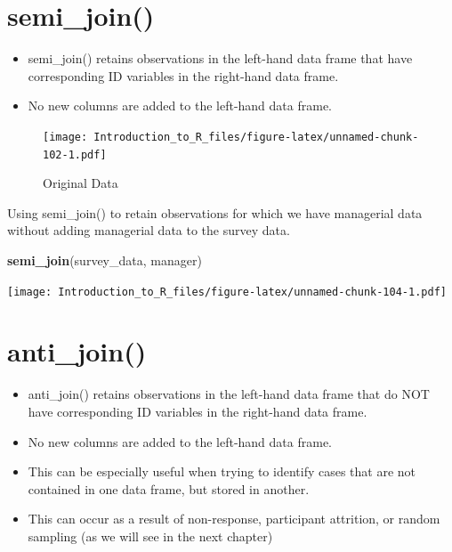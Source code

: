 \documentclass[]{book}
\newenvironment{Shaded}{\begin{snugshade}}{\end{snugshade}}
\newcommand{\KeywordTok}[1]{\textcolor[rgb]{0.13,0.29,0.53}{\textbf{#1}}}
\newcommand{\NormalTok}[1]{#1}
\providecommand{\tightlist}{%
  \setlength{\itemsep}{0pt}\setlength{\parskip}{0pt}}
\theoremstyle{definition}
\theoremstyle{definition}
\theoremstyle{definition}
\theoremstyle{remark}
\let\BeginKnitrBlock\begin \let\EndKnitrBlock\end
\begin{document}
\hypertarget{semi_join}{%
\section{semi\_join()}\label{semi_join}}

\begin{itemize}
\tightlist
\item
  semi\_join() retains observations in the left-hand data frame that have corresponding ID variables in the right-hand data frame.
\item
  No new columns are added to the left-hand data frame.
\end{itemize}

\begin{figure}
\centering
\texttt{[image: Introduction\_to\_R\_files/figure-latex/unnamed-chunk-102-1.pdf]}
\caption{\label{fig:unnamed-chunk-102}Original Data}
\end{figure}

\BeginKnitrBlock{example}
\protect\hypertarget{exm:semijoin1}{}{\label{exm:semijoin1} }Using semi\_join() to retain observations for which we have managerial data without adding managerial data to the survey data.
\EndKnitrBlock{example}

\begin{Shaded}
\begin{Highlighting}[]
\KeywordTok{semi_join}\NormalTok{(survey_data, manager)}
\end{Highlighting}
\end{Shaded}

\texttt{[image: Introduction\_to\_R\_files/figure-latex/unnamed-chunk-104-1.pdf]}

\hypertarget{anti_join}{%
\section{anti\_join()}\label{anti_join}}

\begin{itemize}
\tightlist
\item
  anti\_join() retains observations in the left-hand data frame that do NOT have corresponding ID variables in the right-hand data frame.
\item
  No new columns are added to the left-hand data frame.
\item
  This can be especially useful when trying to identify cases that are not contained in one data frame, but stored in another.
\item
  This can occur as a result of non-response, participant attrition, or random sampling (as we will see in the next chapter)
\end{itemize}
\end{document}
